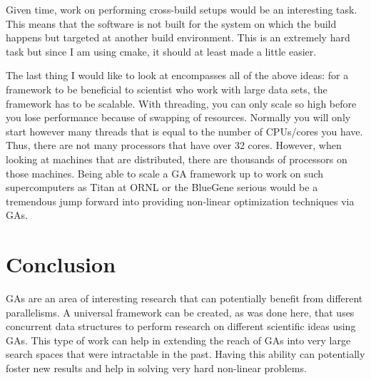 \documentclass{acm_proc_article-sp}
\begin{document}
Given time, work on performing cross-build setups would be an interesting task. This means that the software is not built for the system on which the build happens but targeted at another build environment. This is an extremely hard task but since I am using cmake, it should at least made a little easier.

The last thing I would like to look at encompasses all of the above ideas: for a framework to be beneficial to scientist who work with large data sets, the framework has to be scalable. With threading, you can only scale so high before you lose performance because of swapping of resources. Normally you will only start however many threads that is equal to the number of CPUs/cores you have. Thus, there are not many processors that have over 32 cores. However, when looking at machines that are distributed, there are thousands of processors on those machines. Being able to scale a GA framework up to work on such supercomputers as Titan at ORNL or the BlueGene serious would be a tremendous jump forward into providing non-linear optimization techniques via GAs.


%
%
\section{Conclusion}

GAs are an area of interesting research that can potentially benefit from different parallelisms. A universal framework can be created, as was done here, that uses concurrent data structures to perform research on different scientific ideas using GAs. This type of work can help in extending the reach of GAs into very large search spaces that were intractable in the past. Having this ability can potentially foster new results and help in solving very hard non-linear problems.


%
%




%
%
\balancecolumns


%
%
\end{document}

